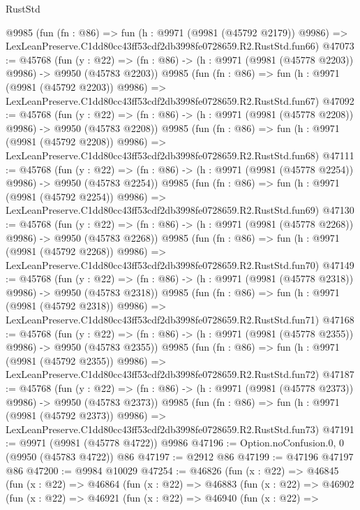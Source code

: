 \begin{lexlean}{RustStd}
\begin{coremodule}
    @9985
    (fun (fn : @86) =>
    fun (h : @9971 (@9981 (@45792 @2179)) @9986) =>
    LexLeanPreserve.C1dd80cc43ff53cdf2db3998fe0728659.R2.RustStd.fun66)
@47073 := @45768
    (fun (y : @22) =>
    (fn : @86) -> (h : @9971 (@9981 (@45778 @2203)) @9986) -> @9950 (@45783 @2203))
    @9985
    (fun (fn : @86) =>
    fun (h : @9971 (@9981 (@45792 @2203)) @9986) =>
    LexLeanPreserve.C1dd80cc43ff53cdf2db3998fe0728659.R2.RustStd.fun67)
@47092 := @45768
    (fun (y : @22) =>
    (fn : @86) -> (h : @9971 (@9981 (@45778 @2208)) @9986) -> @9950 (@45783 @2208))
    @9985
    (fun (fn : @86) =>
    fun (h : @9971 (@9981 (@45792 @2208)) @9986) =>
    LexLeanPreserve.C1dd80cc43ff53cdf2db3998fe0728659.R2.RustStd.fun68)
@47111 := @45768
    (fun (y : @22) =>
    (fn : @86) -> (h : @9971 (@9981 (@45778 @2254)) @9986) -> @9950 (@45783 @2254))
    @9985
    (fun (fn : @86) =>
    fun (h : @9971 (@9981 (@45792 @2254)) @9986) =>
    LexLeanPreserve.C1dd80cc43ff53cdf2db3998fe0728659.R2.RustStd.fun69)
@47130 := @45768
    (fun (y : @22) =>
    (fn : @86) -> (h : @9971 (@9981 (@45778 @2268)) @9986) -> @9950 (@45783 @2268))
    @9985
    (fun (fn : @86) =>
    fun (h : @9971 (@9981 (@45792 @2268)) @9986) =>
    LexLeanPreserve.C1dd80cc43ff53cdf2db3998fe0728659.R2.RustStd.fun70)
@47149 := @45768
    (fun (y : @22) =>
    (fn : @86) -> (h : @9971 (@9981 (@45778 @2318)) @9986) -> @9950 (@45783 @2318))
    @9985
    (fun (fn : @86) =>
    fun (h : @9971 (@9981 (@45792 @2318)) @9986) =>
    LexLeanPreserve.C1dd80cc43ff53cdf2db3998fe0728659.R2.RustStd.fun71)
@47168 := @45768
    (fun (y : @22) =>
    (fn : @86) -> (h : @9971 (@9981 (@45778 @2355)) @9986) -> @9950 (@45783 @2355))
    @9985
    (fun (fn : @86) =>
    fun (h : @9971 (@9981 (@45792 @2355)) @9986) =>
    LexLeanPreserve.C1dd80cc43ff53cdf2db3998fe0728659.R2.RustStd.fun72)
@47187 := @45768
    (fun (y : @22) =>
    (fn : @86) -> (h : @9971 (@9981 (@45778 @2373)) @9986) -> @9950 (@45783 @2373))
    @9985
    (fun (fn : @86) =>
    fun (h : @9971 (@9981 (@45792 @2373)) @9986) =>
    LexLeanPreserve.C1dd80cc43ff53cdf2db3998fe0728659.R2.RustStd.fun73)
@47191 := @9971 (@9981 (@45778 @4722)) @9986
@47196 := Option.noConfusion.{0, 0} (@9950 (@45783 @4722)) @86
@47197 := @2912 @86
@47199 := @47196 @47197 @86
@47200 := @9984 @10029
@47254 := @46826
    (fun (x : @22) =>
    @46845
      (fun (x : @22) =>
      @46864
        (fun (x : @22) =>
        @46883
          (fun (x : @22) =>
          @46902
            (fun (x : @22) =>
            @46921
              (fun (x : @22) =>
              @46940
                (fun (x : @22) =>

\end{coremodule}
\end{lexlean}
